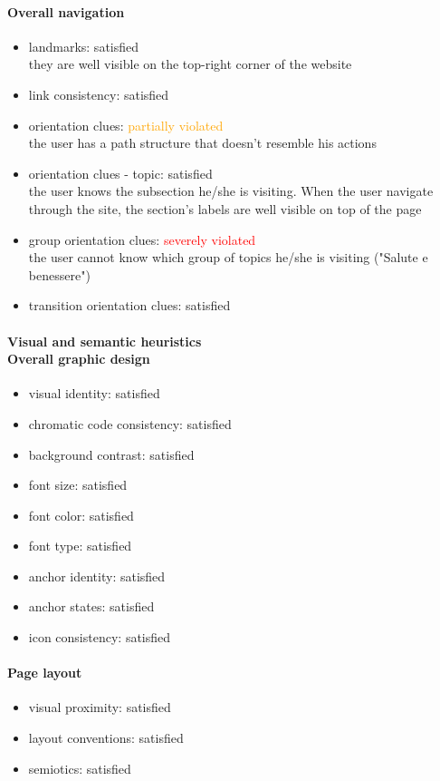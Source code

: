\begin{enumerate}
	\paragraph*{Overall navigation}
	\begin{itemize}
		\item landmarks: satisfied\\
		they are well visible on the top-right corner of the website
		\item link consistency: satisfied
		\item orientation clues: \textcolor{orange}{partially violated}\\
		the user has a path structure that doesn't resemble his actions
		\item orientation clues - topic: satisfied\\
		the user knows the subsection he/she is visiting. When the user navigate through the site, the section's labels are well visible on top of the page
		\item group orientation clues: \textcolor{red}{severely violated}\\
		the user cannot know which group of topics he/she is visiting ("Salute e benessere")
		\item transition orientation clues: satisfied
	\end{itemize}	
	
	\paragraph*{Visual and semantic heuristics \\ Overall graphic design }
	\begin{itemize}
		\item visual identity: satisfied
		\item chromatic code consistency: satisfied
		\item background contrast: satisfied
		\item font size: satisfied
		\item font color: satisfied
		\item font type: satisfied
		\item anchor identity: satisfied
		\item anchor states: satisfied
		\item icon consistency: satisfied
	\end{itemize}
	
	\paragraph*{Page layout}
	\begin{itemize}
		\item visual proximity: satisfied
		\item layout conventions: satisfied
		\item semiotics: satisfied
	\end{itemize}	
	

\end{enumerate}
